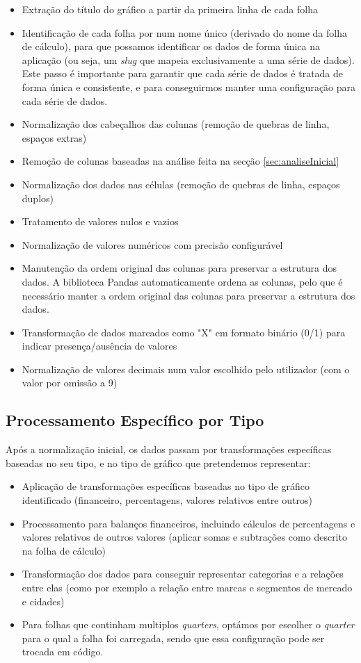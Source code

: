 \begin{itemize}
    \item Extração do título do gráfico a partir da primeira linha de cada folha
    \item Identificação de cada folha por num nome único (derivado do nome da folha de cálculo), para que possamos identificar os dados de forma única na aplicação (ou seja, um \textit{slug} que mapeia exclusivamente a uma série de dados). Este passo é importante para garantir que cada série de dados é tratada de forma única e consistente, e para conseguirmos manter uma configuração para cada série de dados.
    \item Normalização dos cabeçalhos das colunas (remoção de quebras de linha, espaços extras)
    \item Remoção de colunas baseadas na análise feita na secção \ref{sec:analiseInicial}
    \item Normalização dos dados nas células (remoção de quebras de linha, espaços duplos)
    \item Tratamento de valores nulos e vazios
    \item Normalização de valores numéricos com precisão configurável
    \item Manutenção da ordem original das colunas para preservar a estrutura dos dados. A biblioteca Pandas automaticamente ordena as colunas, pelo que é necessário manter a ordem original das colunas para preservar a estrutura dos dados.
    \item Transformação de dados marcados como "X" em formato binário (0/1) para indicar presença/ausência de valores
    \item Normalização de valores decimais num valor escolhido pelo utilizador (com o valor por omissão a 9)
\end{itemize}

\subsection{Processamento Específico por Tipo}

Após a normalização inicial, os dados passam por transformações específicas baseadas no seu tipo, e no tipo de gráfico que pretendemos representar:

\begin{itemize}
    \item Aplicação de transformações específicas baseadas no tipo de gráfico identificado (financeiro, percentagens, valores relativos entre outros)
    \item Processamento para balanços financeiros, incluindo cálculos de percentagens e valores relativos de outros valores (aplicar somas e subtrações como descrito na folha de cálculo)
    \item Transformação dos dados para conseguir representar categorias e a relações entre elas (como por exemplo a relação entre marcas e segmentos de mercado e cidades)
    \item Para folhas que continham multiplos \textit{quarters}, optámos por escolher o \textit{quarter} para o qual a folha foi carregada, sendo que essa configuração pode ser trocada em código.
\end{itemize}

